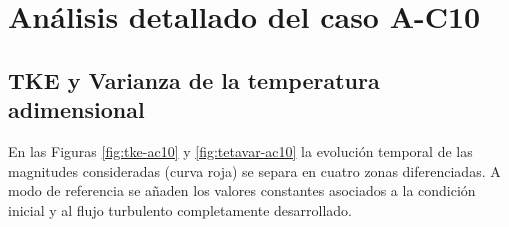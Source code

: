 \newpage

\section{Análisis detallado del caso A-C10} \label{sec:ac10}

\subsection{TKE y Varianza de la temperatura adimensional}

En las Figuras \ref{fig:tke-ac10} y \ref{fig:tetavar-ac10} la evolución temporal de las magnitudes consideradas (curva roja) se separa en cuatro zonas diferenciadas. A modo de referencia se añaden los valores constantes asociados a la condición inicial y al flujo turbulento completamente desarrollado.

